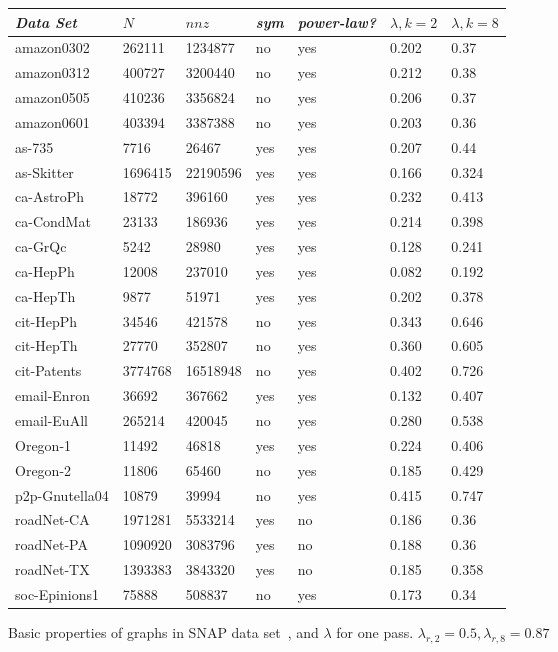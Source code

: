 \documentclass[11pt]{article}
\begin{document}
\begin{figure}
\caption{Basic properties of graphs in SNAP data set~\cite{Leskovec-data}, and $\lambda$ for one pass. $\lambda_{r,2}=0.5,\lambda_{r,8}=0.87$}
\centering
{ \begin{tabular}{ *7l }    \toprule
\emph{Data Set} & $N$ & $nnz$ & \emph{sym} & \emph{power-law?} & $\lambda, k=2$ & $\lambda, k=8$ \\\midrule 
amazon0302 & 262111 & 1234877 & no & yes & 0.202&0.37\\ 
amazon0312 & 400727 & 3200440 & no & yes & 0.212&0.38\\ 
amazon0505 & 410236 & 3356824 & no & yes & 0.206&0.37\\ 
amazon0601 & 403394 & 3387388 & no & yes & 0.203&0.36\\ 
as-735 & 7716 & 26467 & yes & yes & 0.207&0.44\\ 
as-Skitter & 1696415 & 22190596 & yes & yes & 0.166&0.324\\ 
ca-AstroPh & 18772 & 396160 & yes & yes & 0.232&0.413\\ 
ca-CondMat & 23133 & 186936 & yes & yes & 0.214&0.398\\ 
ca-GrQc & 5242 & 28980 & yes & yes & 0.128&0.241\\ 
ca-HepPh & 12008 & 237010 & yes & yes & 0.082&0.192\\ 
ca-HepTh & 9877 & 51971 & yes & yes & 0.202&0.378\\ 
cit-HepPh & 34546 & 421578 & no & yes & 0.343&0.646\\ 
cit-HepTh & 27770 & 352807 & no & yes & 0.360&0.605\\ 
cit-Patents & 3774768 & 16518948 & no & yes & 0.402&0.726\\ 
email-Enron & 36692 & 367662 & yes & yes & 0.132&0.407\\ 
email-EuAll & 265214 & 420045 & no & yes & 0.280&0.538\\ 
Oregon-1 & 11492 & 46818 & yes & yes & 0.224&0.406\\ 
Oregon-2 & 11806 & 65460 & no & yes & 0.185&0.429\\ 
p2p-Gnutella04 & 10879 & 39994 & no & yes & 0.415&0.747\\ 
roadNet-CA & 1971281 & 5533214 & yes & no & 0.186&0.36\\ 
roadNet-PA & 1090920 & 3083796 & yes & no & 0.188&0.36\\ 
roadNet-TX & 1393383 & 3843320 & yes & no & 0.185&0.358\\ 
soc-Epinions1 & 75888 & 508837 & no & yes & 0.173&0.34\\ 

\end{tabular}}
\end{figure}
\end{document}
